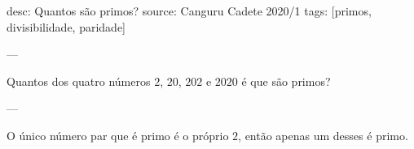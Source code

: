 desc:  Quantos são primos?
source:  Canguru Cadete 2020/1
tags:  [primos, divisibilidade, paridade]

---

Quantos dos quatro números $2$, $20$, $202$ e $2020$ é que são primos?

---

O único número par que é primo é o próprio $2$, então apenas um desses é primo.
